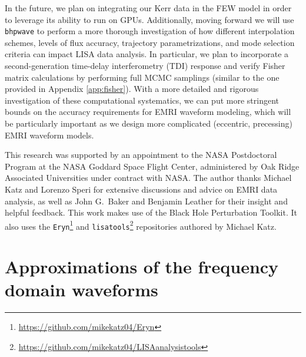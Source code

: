 \documentclass[%
 reprint,
 nofootinbib,
 amsmath,amssymb,
 aps,
 prd,
]{revtex4-2}
\begin{document}
In the future, we plan on integrating our Kerr data in the FEW model in order to leverage its ability to run on GPUs. Additionally, moving forward we will use \texttt{bhpwave} to perform a more thorough investigation of how different interpolation schemes, levels of flux accuracy, trajectory parametrizations, and mode selection criteria can impact LISA data analysis. In particular, we plan to incorporate a second-generation time-delay interferometry (TDI) response and verify Fisher matrix calculations by performing full MCMC samplings (similar to the one provided in Appendix \ref{app:fisher}). With a more detailed and rigorous investigation of these computational systematics, we can put more stringent bounds on the accuracy requirements for EMRI waveform modeling, which will be particularly important as we design more complicated (eccentric, precessing) EMRI waveform models.

\begin{acknowledgements}
This research was supported by an appointment to the NASA Postdoctoral Program at the NASA Goddard Space Flight Center, administered by Oak Ridge Associated Universities under contract with NASA. The author thanks Michael Katz and Lorenzo Speri for extensive discussions and advice on EMRI data analysis, as well as John G.~Baker and Benjamin Leather for their insight and helpful feedback. This work makes use of the Black Hole Perturbation Toolkit. It also uses the \texttt{Eryn}\footnote{\href{https://github.com/mikekatz04/Eryn}{https://github.com/mikekatz04/Eryn}} and \texttt{lisatools}\footnote{\href{https://github.com/mikekatz04/LISAanalysistools}{https://github.com/mikekatz04/LISAanalysistools}} repositories authored by Michael Katz.
\end{acknowledgements}

\appendix

\section{Approximations of the frequency domain waveforms}
\label{app:fourierPhase}
\end{document}
